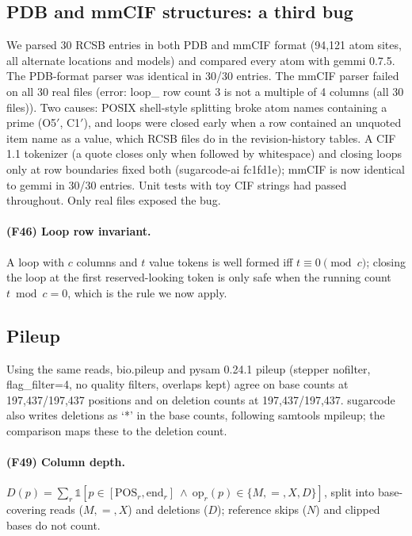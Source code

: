 \subsection{PDB and mmCIF structures: a third bug}
We parsed 30 RCSB entries in both PDB and mmCIF format (94,121 atom sites, all alternate locations and models) and compared every atom with gemmi 0.7.5. The PDB-format parser was identical in 30/30 entries. The mmCIF parser failed on all 30 real files (error: loop\_ row count 3 is not a multiple of 4 columns (all 30 files)). Two causes: POSIX shell-style splitting broke atom names containing a prime (O5$'$, C1$'$), and loops were closed early when a row contained an unquoted item name as a value, which RCSB files do in the revision-history tables. A CIF 1.1 tokenizer (a quote closes only when followed by whitespace) and closing loops only at row boundaries fixed both (sugarcode-ai fc1fd1e); mmCIF is now identical to gemmi in 30/30 entries. Unit tests with toy CIF strings had passed throughout. Only real files exposed the bug.
\paragraph{(F46) Loop row invariant.} A loop with $c$ columns and $t$ value tokens is well formed iff $t\equiv0\pmod c$; closing the loop at the first reserved-looking token is only safe when the running count $t\bmod c=0$, which is the rule we now apply.
\subsection{Pileup}
Using the same reads, bio.pileup and pysam 0.24.1 pileup (stepper nofilter, flag\_filter=4, no quality filters, overlaps kept) agree on base counts at 197,437/197,437 positions and on deletion counts at 197,437/197,437. sugarcode also writes deletions as `*' in the base counts, following samtools mpileup; the comparison maps these to the deletion count.
\paragraph{(F49) Column depth.} $D(p)=\sum_{r}\mathbb 1[p\in[\mathrm{POS}_r,\mathrm{end}_r]\ \wedge\ \mathrm{op}_r(p)\in\{M,=,X,D\}]$, split into base-covering reads ($M,=,X$) and deletions ($D$); reference skips ($N$) and clipped bases do not count.
